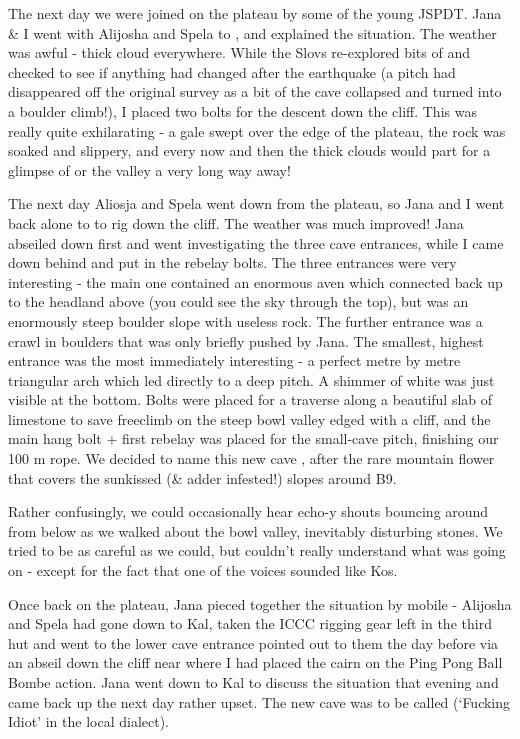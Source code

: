 The next day we were joined on the plateau by some of the young JSPDT.
Jana \& I went with Alijosha and Spela to , and explained the
situation. The weather was awful - thick cloud everywhere. While the
Slovs re-explored bits of  and checked to see if anything had changed
after the earthquake  (a pitch had disappeared off the original survey as
a bit of the cave collapsed and turned into a boulder climb!), I placed
two bolts for the descent down the cliff. This was really quite
exhilarating - a gale swept over the edge of the plateau, the rock was
soaked and slippery, and every now and then the thick clouds would part
for a glimpse of  or the  valley a very long way away!

The next day Aliosja and Spela went down from the plateau, so Jana and I
went back alone to  to rig down the cliff. The weather was much
improved! Jana abseiled down first and went investigating the three cave
entrances, while I came down behind and put in the rebelay bolts. The
three entrances were very interesting - the main one contained an
enormous aven which connected back up to the headland above  (you
could see the sky through the top), but was an enormously steep boulder
slope with useless rock. The further entrance was a crawl in boulders
that was only briefly pushed by Jana. The smallest, highest entrance was
the most immediately interesting - a perfect metre by metre triangular
arch which led directly to a deep pitch. A shimmer of white was just
visible at the bottom. Bolts were placed for a traverse along a
beautiful slab of limestone to save freeclimb on the steep bowl valley
edged with a cliff, and the main hang bolt + first rebelay was placed
for the small-cave pitch, finishing our 100 m rope. We decided to name
this new cave , after the rare mountain flower that covers
the sunkissed (\& adder infested!) slopes around B9.

Rather confusingly, we could occasionally hear echo-y shouts bouncing
around from below as we walked about the bowl valley, inevitably
disturbing stones. We tried to be as careful as we could, but couldn't
really understand what was going on - except for the fact that one of
the voices sounded like Kos.

Once back on the plateau, Jana pieced together the situation by mobile -
Alijosha and Spela had gone down to Kal, taken the ICCC rigging gear
left in the third hut and went to the lower cave entrance pointed out to
them the day before via an abseil down the cliff near 
where I had placed the cairn on the Ping Pong Ball Bombe action. Jana
went down to Kal to discuss the situation that evening and came back up
the next day rather upset. The new cave was to be called 
(`Fucking Idiot' in the local dialect).


